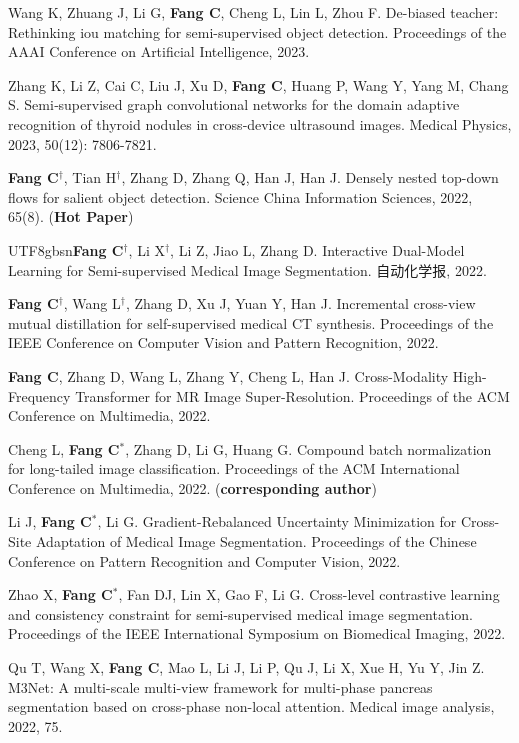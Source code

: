 \documentclass[a4paper,36pt]{article}
\newcommand{\tb}[1]{\textbf{#1}}
\newcommand{\resumeItemWithoutTitle}[1]{
  \item\justifying\small{
    {#1 \vspace{-2pt}}
  }
}
\newcommand{\resumeChnItemWithoutTitle}[1]{
  \item\justifying\small{
    {\begin{CJK}{UTF8}{gbsn}#1\end{CJK} \vspace{-2pt}}
  }
}
\newcommand{\resumeChnItemWithoutTitle}[1]{
  \item\justifying\small{#1}
}
\begin{document}
\resumeItemWithoutTitle{Wang K, Zhuang J, Li G, \tb{Fang C}, Cheng L, Lin L, Zhou F. De-biased teacher: Rethinking iou matching for semi-supervised object detection. Proceedings of the AAAI Conference on Artificial Intelligence, 2023.}

\resumeItemWithoutTitle{Zhang K, Li Z, Cai C, Liu J, Xu D, \tb{Fang C}, Huang P, Wang Y, Yang M, Chang S. Semi‐supervised graph convolutional networks for the domain adaptive recognition of thyroid nodules in cross‐device ultrasound images. Medical Physics, 2023, 50(12): 7806-7821.}
\resumeItemWithoutTitle{\tb{Fang C}$^\dag$, Tian H$^\dag$, Zhang D, Zhang Q, Han J, Han J. Densely nested top-down flows for salient object detection. Science China Information Sciences, 2022, 65(8). (\tb{Hot Paper}) }

\resumeChnItemWithoutTitle{\textbf{Fang C}$^\dag$, Li X$^\dag$, Li Z, Jiao L, Zhang D. Interactive Dual-Model Learning for Semi-supervised Medical Image Segmentation. 自动化学报, 2022.}

\resumeItemWithoutTitle{\tb{Fang C}$^{\dag}$, Wang L$^{\dag}$, Zhang D, Xu J, Yuan Y, Han J. Incremental cross-view mutual distillation for self-supervised medical CT synthesis. Proceedings of the IEEE Conference on Computer Vision and Pattern Recognition, 2022.}

\resumeItemWithoutTitle{\textbf{Fang C}, Zhang D, Wang L, Zhang Y, Cheng L, Han J. Cross-Modality High-Frequency Transformer for MR Image Super-Resolution. Proceedings of the ACM Conference on Multimedia, 2022. }

\resumeItemWithoutTitle{Cheng L, \tb{Fang C}$^{\ast}$, Zhang D, Li G, Huang G. Compound batch normalization for long-tailed image classification. Proceedings of the ACM International Conference on Multimedia, 2022. (\tb{corresponding author})}
\resumeItemWithoutTitle{Li J, \tb{Fang C}$^{\ast}$, Li G. Gradient-Rebalanced Uncertainty Minimization for Cross-Site Adaptation of Medical Image Segmentation. Proceedings of the Chinese Conference on Pattern Recognition and Computer Vision, 2022.}


\resumeItemWithoutTitle{Zhao X, \tb{Fang C}$^{\ast}$, Fan DJ, Lin X, Gao F, Li G. Cross-level contrastive learning and consistency constraint for semi-supervised medical image segmentation. Proceedings of the IEEE International Symposium on Biomedical Imaging, 2022.}






\resumeItemWithoutTitle{Qu T, Wang X, \tb{Fang C}, Mao L, Li J, Li P, Qu J, Li X, Xue H, Yu Y, Jin Z. M3Net: A multi-scale multi-view framework for multi-phase pancreas segmentation based on cross-phase non-local attention. Medical image analysis, 2022, 75.}
\end{document}
